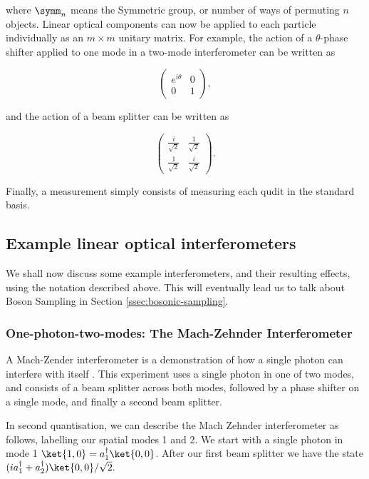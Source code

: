 \noindent where $\symm_n$ means the Symmetric group, or number of ways of permuting $n$ objects. Linear optical components can now be applied to each particle individually as an $m \times m$ unitary matrix. For example, the action of a $\theta$-phase shifter applied to one mode in a two-mode interferometer can be written as

\begin{equation}
\begin{pmatrix}
e^{i\theta} & 0\\
0 & 1
\end{pmatrix},
\end{equation}

\noindent and the action of a beam splitter can be written as

\begin{equation}
\begin{pmatrix}
\frac{i}{\sqrt{2}} & \frac{1}{\sqrt{2}}\\
\frac{1}{\sqrt{2}} & \frac{i}{\sqrt{2}}
\end{pmatrix}.
\end{equation}

Finally, a measurement simply consists of measuring each qudit in the standard basis.

\subsection{Example linear optical interferometers}
\label{ssec:example-interferometers}

We shall now discuss some example interferometers, and their resulting effects, using the notation described above. This will eventually lead us to talk about Boson Sampling in Section \ref{ssec:bosonic-sampling}.

\subsubsection{One-photon-two-modes: The Mach-Zehnder Interferometer}

A Mach-Zender interferometer is a demonstration of how a single photon can interfere with itself \cite{zehnder1891,mach1892}. This experiment uses a single photon in one of two modes, and consists of a beam splitter across both modes, followed by a phase shifter on a single mode, and finally a second beam splitter.

In second quantisation, we can describe the Mach Zehnder interferometer as follows, labelling our spatial modes 1 and 2. We start with a single photon in mode 1 $\ket{1,0} = a_1^\dagger\ket{0,0}$. After our first beam splitter we have the state $(ia_1^\dagger + a_2^\dagger)\ket{0,0}/\sqrt{2}.$

